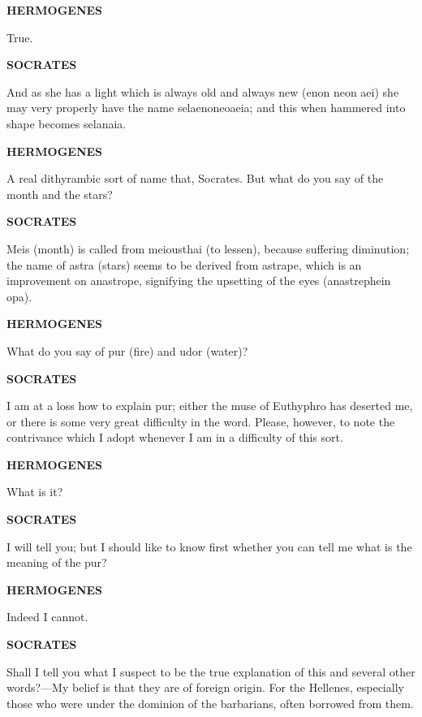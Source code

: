 \documentclass[11pt,letter]{article}
\begin{document}
\par \textbf{HERMOGENES}
\par   True.

\par \textbf{SOCRATES}
\par   And as she has a light which is always old and always new (enon neon aei) she may very properly have the name selaenoneoaeia; and this when hammered into shape becomes selanaia.

\par \textbf{HERMOGENES}
\par   A real dithyrambic sort of name that, Socrates. But what do you say of the month and the stars?

\par \textbf{SOCRATES}
\par   Meis (month) is called from meiousthai (to lessen), because suffering diminution; the name of astra (stars) seems to be derived from astrape, which is an improvement on anastrope, signifying the upsetting of the eyes (anastrephein opa).

\par \textbf{HERMOGENES}
\par   What do you say of pur (fire) and udor (water)?

\par \textbf{SOCRATES}
\par   I am at a loss how to explain pur; either the muse of Euthyphro has deserted me, or there is some very great difficulty in the word. Please, however, to note the contrivance which I adopt whenever I am in a difficulty of this sort.

\par \textbf{HERMOGENES}
\par   What is it?

\par \textbf{SOCRATES}
\par   I will tell you; but I should like to know first whether you can tell me what is the meaning of the pur?

\par \textbf{HERMOGENES}
\par   Indeed I cannot.

\par \textbf{SOCRATES}
\par   Shall I tell you what I suspect to be the true explanation of this and several other words?—My belief is that they are of foreign origin. For the Hellenes, especially those who were under the dominion of the barbarians, often borrowed from them.
\end{document}
